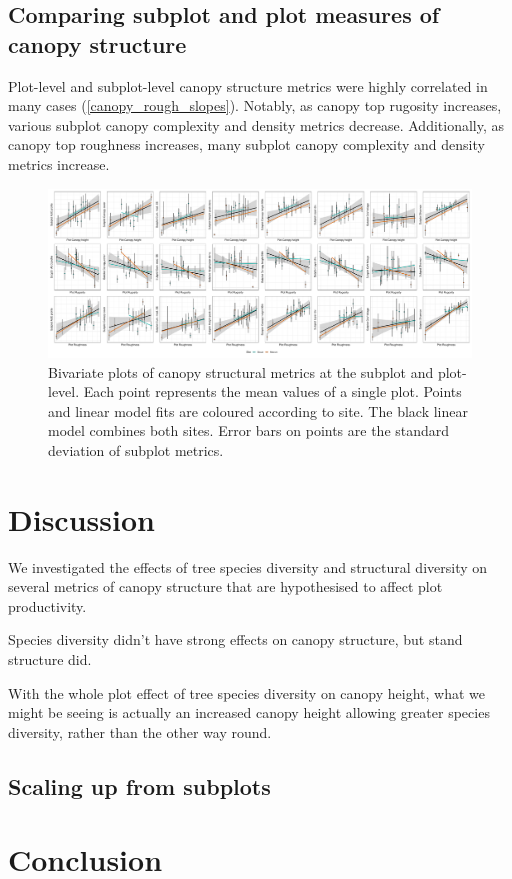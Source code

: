 \documentclass[11pt,a4paper]{article}
\newcommand{\beginsupplement}{%
	\setcounter{table}{0}
	\renewcommand{\thetable}{S\arabic{table}}%
	\setcounter{figure}{0}
	\renewcommand{\thefigure}{S\arabic{figure}}%
}
\begin{document}
\subsection{Comparing subplot and plot measures of canopy structure}

Plot-level and subplot-level canopy structure metrics were highly correlated in many cases (\autoref{canopy_rough_slopes}). Notably, as canopy top rugosity increases, various subplot canopy complexity and density metrics decrease. Additionally, as canopy top roughness increases, many subplot canopy complexity and density metrics increase.


\begin{figure}[H]
\centering
	\includegraphics[width=\textwidth]{plot_subplot_bivar}
	\caption{Bivariate plots of canopy structural metrics at the subplot and plot-level. Each point represents the mean values of a single plot. Points and linear model fits are coloured according to site. The black linear model combines both sites. Error bars on points are the standard deviation of subplot metrics.}
	\label{plot_subplot_bivar}
\end{figure}



\section{Discussion}

We investigated the effects of tree species diversity and structural diversity on several metrics of canopy structure that are hypothesised to affect plot productivity.

Species diversity didn't have strong effects on canopy structure, but stand structure did.

With the whole plot effect of tree species diversity on canopy height, what we might be seeing is actually an increased canopy height allowing greater species diversity, rather than the other way round.

\subsection{Scaling up from subplots}

\section{Conclusion}

\printbibliography

\end{document}
